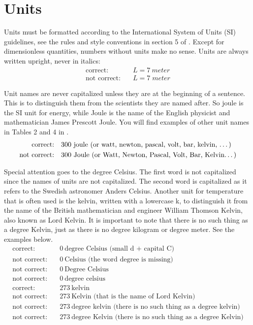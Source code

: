 \section{Units}\label{sec:formatunits}
Units must be formatted according to the International System of Units (SI) guidelines, see the rules and style conventions in section 5 of \cite{SI}. Except for dimensionless quantities, numbers without units make no sense. Units are always written upright, never in italics:
\begin{align*}
    \text{correct:} \quad & L = \qty{7}{meter} \\
    \text{not correct:} \quad & L = 7 \; meter
\end{align*}

Unit names are never capitalized unless they are at the beginning of a sentence. This is to distinguish them from the scientists they are named after. So joule is the SI unit for energy, while Joule is the name of the English physicist and mathematician James Prescott Joule. You will find examples of other unit names in Tables 2 and 4 in \cite{SI}.
\begin{align*}
    \text{correct:}     \quad & 300~\text{joule (or watt, newton, pascal, volt, bar, kelvin, \dots)} \\
    \text{not correct:} \quad & 300~\text{Joule (or Watt, Newton, Pascal, Volt, Bar, Kelvin\dots)}
\end{align*}

Special attention goes to the degree Celsius. The first word is not capitalized since the names of units are not capitalized. The second word is capitalized as it refers to the Swedish astronomer Anders Celsius. Another unit for temperature that is often used is the kelvin, written with a lowercase k, to distinguish it from the name of the British mathematician and engineer William Thomson Kelvin, also known as Lord Kelvin. It is important to note that there is no such thing as a degree Kelvin, just as there is no degree kilogram or degree meter. See the examples below.
\begin{align*}
    \text{correct:}     \quad & 0~\text{degree Celsius (small d + capital C)}\\
    \text{not correct:} \quad & 0~\text{Celsius (the word degree is missing)}\\
    \text{not correct:} \quad & 0~\text{Degree Celsius}\\
    \text{not correct:} \quad & 0~\text{degree celsius}\\
    \text{correct:}     \quad & 273~\text{kelvin}\\
    \text{not correct:}  \quad & 273~\text{Kelvin (that is the name of Lord Kelvin)}\\
    \text{not correct:} \quad & 273~\text{degree kelvin (there is no such thing as a degree kelvin)}\\
    \text{not correct:} \quad & 273~\text{degree Kelvin (there is no such thing as a degree Kelvin)}\\
\end{align*}

